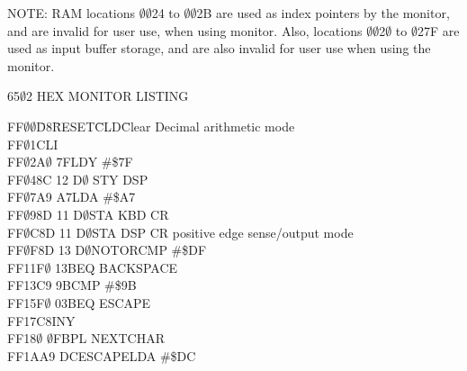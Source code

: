 \documentclass[letterpaper]{article}
\begin{document}
\newpage
\begin{multicols}{2}

\end{multicols}
\begin{center}
NOTE: RAM locations $\emptyset$$\emptyset$24 to $\emptyset$$\emptyset$2B are used as index pointers by the monitor, and are invalid for user use, when using monitor. Also, locations $\emptyset$$\emptyset$2$\emptyset$ to $\emptyset$27F are used as input buffer storage, and are also invalid for user use when using the monitor.

\newpage

65$\emptyset$2 HEX MONITOR LISTING
\end{center}

\begin{tabbing}
FF$\emptyset\emptyset$\hspace{.18in}\=D8\hspace{.75in}\=RESET\hspace{.5in}\=CLD\hspace{1.25in}\={\rmfamily Clear Decimal arithmetic mode}\\
FF$\emptyset$1\>\>CLI\>\\
FF$\emptyset$2\>A$\emptyset$ 7F\>\>LDY \#\$7F\\
FF$\emptyset$4\>8C 12 D$\emptyset$ \> \>STY DSP \\
FF$\emptyset$7\>A9 A7\>\>LDA \#\$A7\\
FF$\emptyset$9\>8D 11 D$\emptyset$\>\>STA KBD CR\\
FF$\emptyset$C\>8D 11 D$\emptyset$\>\>STA DSP CR\> {\rmfamily \hspace{.125in}positive edge sense/output mode}\\
FF$\emptyset$F\>8D 13 D$\emptyset$\>NOTOR\>CMP \#\$DF\\
FF11\>F$\emptyset$ 13\>\>BEQ BACKSPACE\\
FF13\>C9 9B\>\>CMP \#\$9B\\
FF15\>F$\emptyset$ 03\>\>BEQ ESCAPE\\
FF17\>C8\>\>INY\\
FF18$\emptyset$ $\emptyset$F\>\>BPL NEXTCHAR\\
FF1A\>A9 DC\>ESCAPE\>LDA \#\$DC\\

\end{tabbing}
\end{document}
